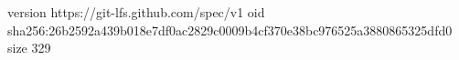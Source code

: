 version https://git-lfs.github.com/spec/v1
oid sha256:26b2592a439b018e7df0ac2829c0009b4cf370e38bc976525a3880865325dfd0
size 329
